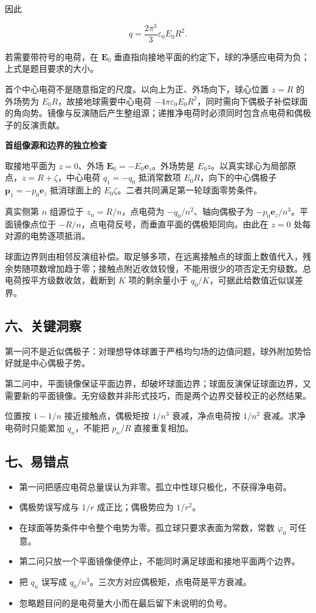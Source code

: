 \documentclass[12pt,a4paper,UTF8]{ctexart}
\newcommand{\tightlist}{\setlength{\itemsep}{0pt}\setlength{\parskip}{0pt}}
\begin{document}
因此

\[\boxed{
q=\frac{2\pi^3}{3}\varepsilon_0E_0R^2
}.\]

若需要带符号的电荷，在 \(\bm E_0\)
垂直指向接地平面的约定下，球的净感应电荷为负；上式是题目要求的大小。

首个中心电荷不是随意指定的尺度。以向上为正、外场向下，球心位置 \(z=R\)
的外场势为 \(E_0R\)，故接地球需要中心电荷
\(-4\pi\varepsilon_0E_0R^2\)，同时需向下偶极子补偿球面的角向势。镜像与反演随后产生整组源；递推净电荷时必须同时包含点电荷和偶极子的反演贡献。

\textbf{首组像源和边界的独立检查}

取接地平面为 \(z=0\)、外场 \(\bm E_0=-E_0\bm e_z\)。外场势是
\(E_0z\)。以真实球心为局部原点，\(z=R+\zeta\)，中心电荷 \(q_1=-q_0\)
抵消常数项 \(E_0R\)，向下的中心偶极子 \(\bm p_1=-p_0\bm e_z\)
抵消球面上的 \(E_0\zeta\)。二者共同满足第一轮球面零势条件。

真实侧第 \(n\) 组源位于 \(z_n=R/n\)，点电荷为 \(-q_0/n^2\)、轴向偶极子为
\(-p_0\bm e_z/n^3\)。平面镜像点位于
\(-R/n\)，点电荷反号，而垂直平面的偶极矩同向。由此在 \(z=0\)
处每对源的电势逐项抵消。

球面边界则由相邻反演组补偿。取足够多项，在远离接触点的球面上数值代入，残余势随项数增加趋于零；接触点附近收敛较慢，不能用很少的项否定无穷级数。总电荷按平方级数收敛，截断到
\(K\) 项的剩余量小于 \(q_0/K\)，可据此给数值近似误差界。

\subsection{六、关键洞察}\label{ux516dux5173ux952eux6d1eux5bdf-3}

第一问不是近似偶极子：对理想导体球置于严格均匀场的边值问题，球外附加势恰好就是中心偶极子势。

第二问中，平面镜像保证平面边界，却破坏球面边界；球面反演保证球面边界，又需要新的平面镜像。无穷级数并非形式技巧，而是两个边界交替校正的必然结果。

位置按 \(1-1/n\) 接近接触点，偶极矩按 \(1/n^3\) 衰减，净点电荷按
\(1/n^2\) 衰减。求净电荷时只能累加 \(q_n\)，不能把 \(p_n/R\)
直接重复相加。

\subsection{七、易错点}\label{ux4e03ux6613ux9519ux70b9-3}

\begin{itemize}
\tightlist
\item
  第一问把感应电荷总量误认为非零。孤立中性球只极化，不获得净电荷。
\item
  偶极势误写成与 \(1/r\) 成正比；偶极势应为 \(1/r^2\)。
\item
  在球面等势条件中令整个电势为零。孤立球只要求表面为常数，常数
  \(\varphi_0\) 可任意。
\item
  第二问只放一个平面镜像便停止，不能同时满足球面和接地平面两个边界。
\item
  把 \(q_n\) 误写成 \(q_0/n^3\)。三次方对应偶极矩，点电荷是平方衰减。
\item
  忽略题目问的是电荷量大小而在最后留下未说明的负号。
\end{itemize}
\end{document}
